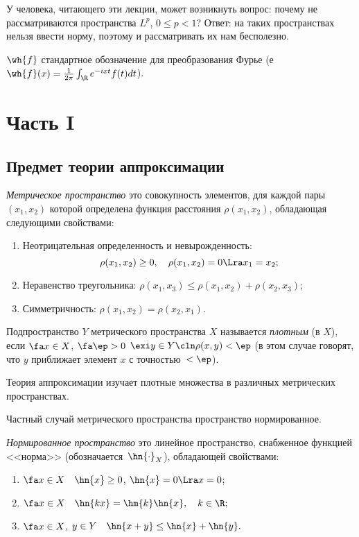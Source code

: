 \documentclass[a4paper]{article}
\begin{document}
\medskip

У человека, читающего эти лекции, может возникнуть вопрос: почему
не рассматриваются пространства $L^p$, $0\le p<1$? Ответ: на таких
пространствах нельзя ввести норму, поэтому и рассматривать их нам
бесполезно.

\medskip

$\wh{f}$ стандартное обозначение для преобразования Фурье (е
$\wh{f}(x)=\frac1{2\pi}\int_\R e^{-ixt}f(t)dt$).

\newpage

\tableofcontents
\newpage

\section{Часть I}

\subsection{Предмет теории аппроксимации}

\begin{df}
  \emph{Метрическое пространство} это совокупность элементов, для каждой пары $(x_1,x_2)$ которой
  определена функция расстояния $\rho(x_1,x_2)$, обладающая следующими свойствами:
  \begin{enumerate}
  \item Неотрицательная определенность и невырожденность:
    $$\rho(x_1,x_2) \ge 0,\quad \rho(x_1,x_2)=0\Lra x_1=x_2;$$
  \item Неравенство треугольника: $\rho(x_1,x_3)\le\rho(x_1,x_2)+\rho(x_2,x_3)$;
  \item Симметричность: $\rho(x_1,x_2)=\rho(x_2,x_1)$.
  \end{enumerate}
\end{df}

\begin{df}
  Подпространство $Y$ метрического пространства $X$
  называется \emph{плотным} (в $X$), если $\fa x\in X$, $\fa\ep>0$ $\exi y\in Y\cln \rho(x,y)<\ep$
  (в этом случае говорят, что $y$ приближает элемент $x$ с точностью~$<\ep$).
\end{df}

Теория аппроксимации изучает плотные множества в различных метрических пространствах.

Частный случай метрического пространства пространство нормированное.

\begin{df}
  \emph{Нормированное пространство} это линейное пространство, снабженное функцией
  <<норма>> (обозначается~$\hn{\cdot}_X$), обладающей свойствами:
  \begin{enumerate}
  \item
    $\fa x\in X\quad\hn{x}\ge 0$, $\hn{x}=0\Lra x=0$;
  \item
    $\fa x\in X\quad\hn{kx}=\hm{k}\hn{x},\quad k\in\R;$
  \item
    $\fa x\in X$, $y\in Y\quad\hn{x+y}\le\hn{x}+\hn{y}.$
  \end{enumerate}
\end{df}
\end{document}
